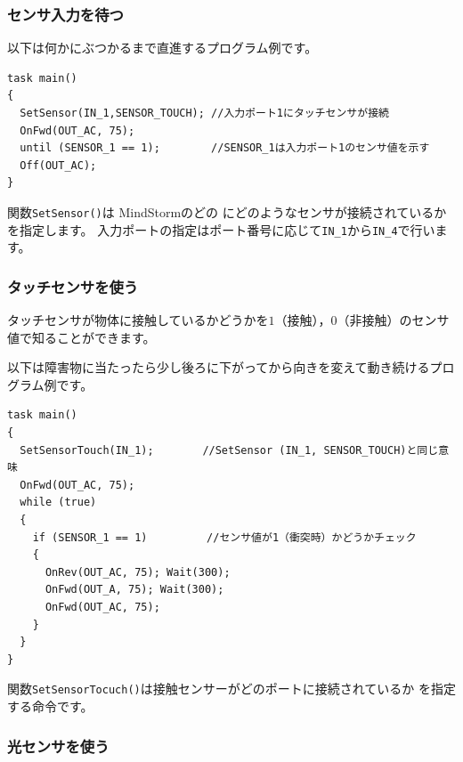 \documentclass[11pt]{jarticle}
\makeatletter
\def\nmindex{\@ifnextchar[{\@nmindex}{\@@nmindex}}
\def\@nmindex[#1]#2{#2\index{#1@#2}}
\def\@@nmindex#1{#1\index{#1}}
\makeatother
\begin{document}
\subsubsection{センサ入力を待つ}
以下は何かにぶつかるまで直進するプログラム例です。
\begin{screen}{\small
\begin{verbatim}
task main() 
{ 
  SetSensor(IN_1,SENSOR_TOUCH); //入力ポート1にタッチセンサが接続
  OnFwd(OUT_AC, 75); 
  until (SENSOR_1 == 1);        //SENSOR_1は入力ポート1のセンサ値を示す
  Off(OUT_AC); 
} 
\end{verbatim}}
\end{screen}
関数\verb|SetSensor()|は MindStormのどの
\nmindex[にゅうりょくぽーと]{入力ポート}にどのようなセンサが接続されているかを指定します。
入力ポートの指定はポート番号に応じて\verb|IN_1|から\verb|IN_4|で行います。

\subsubsection{タッチセンサを使う}
タッチセンサが物体に接触しているかどうかを$1$（接触），$0$（非接触）のセンサ値で知ることができます。

以下は障害物に当たったら少し後ろに下がってから向きを変えて動き続けるプログラム例です。

\begin{screen}{\small
\begin{verbatim}
task main() 
{ 
  SetSensorTouch(IN_1); 　　　　//SetSensor (IN_1, SENSOR_TOUCH)と同じ意味
  OnFwd(OUT_AC, 75); 
  while (true) 
  { 
    if (SENSOR_1 == 1) 　　　　　//センサ値が1（衝突時）かどうかチェック
    { 
      OnRev(OUT_AC, 75); Wait(300); 
      OnFwd(OUT_A, 75); Wait(300); 
      OnFwd(OUT_AC, 75); 
    } 
  } 
}
\end{verbatim}}
\end{screen}
関数\verb|SetSensorTocuch()|は接触センサーがどのポートに接続されているか
を指定する命令です。


\subsubsection{光センサを使う}
\end{document}
